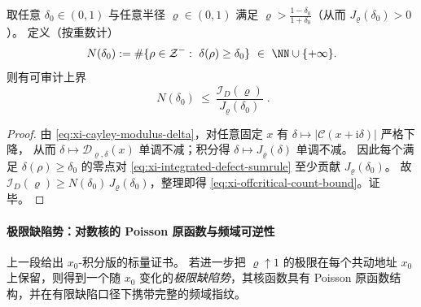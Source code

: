 

\begin{corollary}[离临界线偏移的计数上界]\label{cor:xi-offcritical-count-bound-by-integrated-defect}
取任意 \(\delta_0\in(0,1)\) 与任意半径 \(\varrho\in(0,1)\) 满足 \(\varrho>\frac{1-\delta_0}{1+\delta_0}\)（从而 \(J_{\varrho}(\delta_0)>0\)）。
定义（按重数计）
\[
N(\delta_0):=\#\{\rho\in\mathcal{Z}^-:\ \delta(\rho)\ge \delta_0\}\ \in\ \NN\cup\{+\infty\}.
\]
则有可审计上界
\begin{equation}\label{eq:xi-offcritical-count-bound}
\boxed{\;
N(\delta_0)\ \le\ \frac{\mathcal{I}_D(\varrho)}{J_{\varrho}(\delta_0)}\; }.
\end{equation}
\end{corollary}

\begin{proof}
由 \eqref{eq:xi-cayley-modulus-delta}，对任意固定 \(x\) 有 \(\delta\mapsto |\mathcal{C}(x+\mathrm{i}\delta)|\) 严格下降，
从而 \(\delta\mapsto \mathcal{D}_{\varrho,\delta}(x)\) 单调不减；积分得 \(\delta\mapsto J_{\varrho}(\delta)\) 单调不减。
因此每个满足 \(\delta(\rho)\ge\delta_0\) 的零点对 \eqref{eq:xi-integrated-defect-sumrule} 至少贡献 \(J_{\varrho}(\delta_0)\)。
故 \(\mathcal{I}_D(\varrho)\ge N(\delta_0)\,J_{\varrho}(\delta_0)\)，整理即得 \eqref{eq:xi-offcritical-count-bound}。证毕。
\end{proof}

\paragraph{极限缺陷势：对数核的 Poisson 原函数与频域可逆性}
上一段给出 \(x_0\)-积分版的标量证书。
若进一步把 \(\varrho\uparrow 1\) 的极限在每个共动地址 \(x_0\) 上保留，则得到一个随 \(x_0\) 变化的\emph{极限缺陷势}，其核函数具有 Poisson 原函数结构，并在有限缺陷口径下携带完整的频域指纹。

